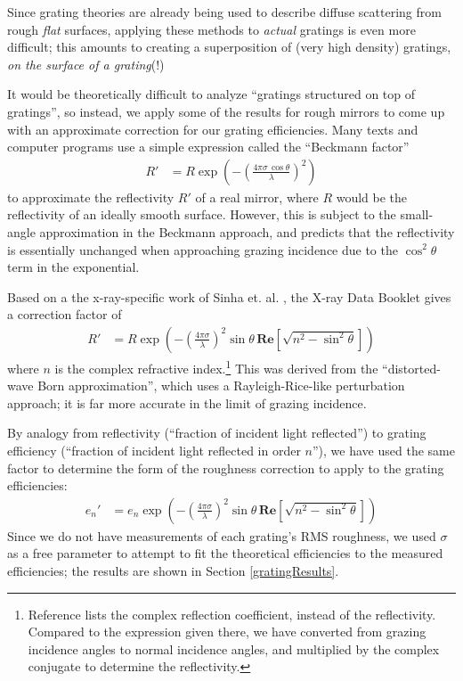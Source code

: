 Since grating theories are already being used to describe diffuse scattering from rough \emph{flat} surfaces, applying these methods to \emph{actual} gratings is even more difficult; this amounts to creating a superposition of (very high density) gratings, \emph{on the surface of a grating}(!)
 
 It would be theoretically difficult to analyze ``gratings structured on top of gratings'', so instead, we apply some of the results for rough mirrors to come up with an approximate correction for our grating efficiencies.  Many texts and computer programs use a simple expression called the ``Beckmann factor''
\begin{align}
\label{beckmannFactor}
R' &= R \exp\left(  - \left(\frac{4\pi\sigma \,  \cos \theta}{\lambda}\right)^2    \right)
\end{align}
to approximate the reflectivity $R'$ of a real mirror, where $R$ would be the reflectivity of an ideally smooth surface.  However, this is subject to the small-angle approximation in the Beckmann approach, and predicts that the reflectivity is essentially unchanged  when approaching grazing incidence due to the $\cos^2\theta$ term in the exponential. 
 
Based on a the x-ray-specific work of Sinha et. al. \cite{Sin88}, the X-ray Data Booklet \cite{Tho01} gives a correction factor of
\begin{align}
R' &= R \exp\left(  - \left(\frac{4\pi\sigma}{\lambda}\right)^2 \sin \theta \, \mathbf{Re}\left[ \sqrt{n^2 - \sin^2 \theta}  \right]    \right)
\end{align}
where $n$ is the complex refractive index.\footnote{Reference \cite{Tho01} lists the complex reflection coefficient, instead of the reflectivity.  Compared to the expression given there, we have converted from grazing incidence angles to normal incidence angles, and multiplied by the complex conjugate to determine the reflectivity.}  This was derived from the ``distorted-wave Born approximation'', which uses a Rayleigh-Rice-like perturbation approach; it is far more accurate in the limit of grazing incidence.

By analogy from reflectivity (``fraction of incident light reflected'') to grating efficiency (``fraction of incident light reflected in order $n$''), we have used the same factor to determine the form of the roughness correction to apply to the grating efficiencies:
\begin{align}
e_n' &= e_n \exp\left(  - \left(\frac{4\pi\sigma}{\lambda}\right)^2 \sin \theta \, \mathbf{Re}\left[ \sqrt{n^2 - \sin^2 \theta}  \right]    \right)
\label{roughnessCorrection}
\end{align}
Since we do not have measurements of each grating's RMS roughness, we used $\sigma$ as a free parameter to attempt to fit the theoretical efficiencies to the measured efficiencies; the results are shown in Section \ref{gratingResults}.

